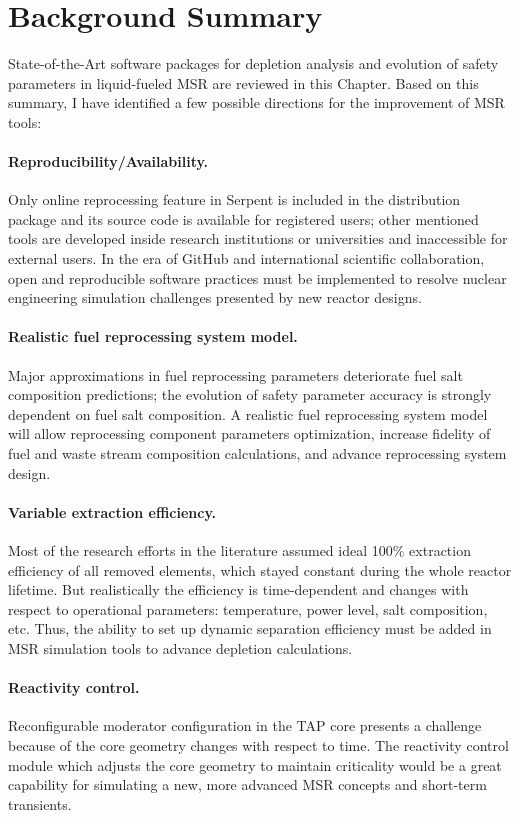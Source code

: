 \section{Background Summary}
State-of-the-Art software packages for depletion analysis and evolution of 
safety parameters in liquid-fueled \gls{MSR} are reviewed in this Chapter. 
Based on this summary, I have identified a few possible directions for 
the improvement of \gls{MSR} tools:
\paragraph{Reproducibility/Availability.} Only online reprocessing feature in 
Serpent is included in the distribution package and its source code is 
available for registered users; other mentioned tools are developed inside 
research institutions or universities and inaccessible for external users. In 
the era 
of GitHub \cite{github_github_2015} and international scientific 
collaboration, open and reproducible software practices must be implemented to 
resolve nuclear engineering simulation challenges presented by new reactor 
designs.
\paragraph{Realistic fuel reprocessing system model.} 
Major approximations in fuel reprocessing parameters deteriorate fuel salt 
composition predictions; the evolution of safety parameter accuracy is 
strongly dependent on fuel salt composition. A realistic fuel reprocessing 
system model will allow reprocessing component parameters optimization,  
increase fidelity of fuel and waste stream composition calculations, and 
advance reprocessing system design.
\paragraph{Variable extraction efficiency.} Most of the research efforts in 
the literature assumed ideal 100\% extraction efficiency of all removed 
elements, which stayed 
constant during the whole reactor lifetime. But realistically the efficiency 
is time-dependent and changes with respect to operational parameters: 
temperature, power level, salt composition, etc. Thus, the ability to set up 
dynamic separation efficiency must be added in \gls{MSR} simulation tools to 
advance depletion calculations.
\paragraph{Reactivity control.} Reconfigurable moderator configuration in the 
\gls{TAP} core presents a challenge because of the core geometry changes with 
respect to time. The reactivity control module which adjusts the core geometry 
to maintain criticality would be a great capability for simulating a new, more 
advanced \gls{MSR} concepts and short-term transients.
